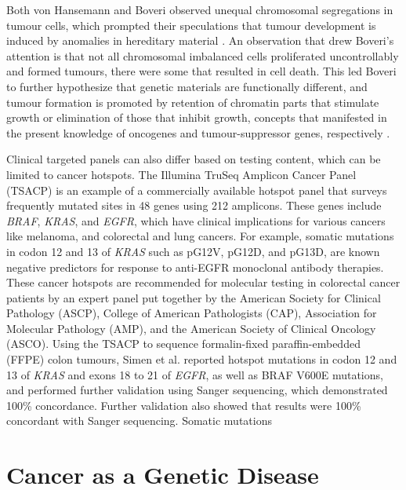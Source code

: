 Both von Hansemann and Boveri observed unequal chromosomal segregations in tumour cells, which prompted their speculations that tumour development is induced by anomalies in hereditary material \cite{VonHansemann1890, Boveri1914}. An observation that drew Boveri's attention is that not all chromosomal imbalanced cells proliferated uncontrollably and formed tumours, there were some that resulted in cell death. This led Boveri to further hypothesize that genetic materials are functionally different, and tumour formation is promoted by retention of chromatin parts that stimulate growth or elimination of those that inhibit growth, concepts that manifested in the present knowledge of oncogenes and tumour-suppressor genes, respectively \cite{Boveri1914}.

Clinical targeted panels can also differ based on testing content, which can be limited to cancer hotspots. The Illumina TruSeq Amplicon Cancer Panel (TSACP) is an example of a commercially available hotspot panel that surveys frequently mutated sites in 48 genes using 212 amplicons. These genes include \textit{BRAF}, \textit{KRAS}, and \textit{EGFR}, which have clinical implications for various cancers like melanoma, and colorectal and lung cancers. For example, somatic mutations in codon 12 and 13 of \textit{KRAS} such as pG12V, pG12D, and pG13D, are known negative predictors for response to anti-EGFR monoclonal antibody therapies. These cancer hotspots are recommended for molecular testing in colorectal cancer patients by an expert panel put together by the American Society for Clinical Pathology (ASCP), College of American Pathologists (CAP), Association for Molecular Pathology (AMP), and the American Society of Clinical Oncology (ASCO). Using the TSACP to sequence formalin-fixed paraffin-embedded (FFPE) colon tumours, Simen et al. \cite{} reported hotspot mutations in codon 12 and 13 of \textit{KRAS} and exons 18 to 21 of \textit{EGFR}, as well as BRAF V600E mutations, and performed further validation using Sanger sequencing, which demonstrated 100\% concordance. Further validation also showed that results were 100\% concordant with Sanger sequencing. Somatic mutations

\section{Cancer as a Genetic Disease}
\label{sec:CancerasaGeneticDisease}

